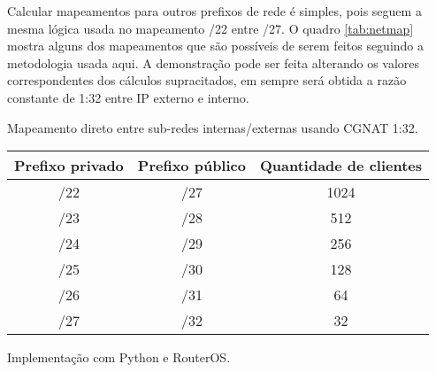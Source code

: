     Calcular mapeamentos para outros prefixos de rede é simples, pois seguem a mesma lógica usada no mapeamento /22 entre /27. O quadro \ref{tab:netmap} mostra alguns dos mapeamentos que são possíveis de serem feitos seguindo a metodologia usada aqui. A demonstração pode ser feita alterando os valores correspondentes dos cálculos supracitados, em sempre será obtida a razão constante de 1:32 entre IP externo e interno.

    \begin{quadro}[htb]
        \begin{center}
            \caption{Mapeamento direto entre sub-redes internas/externas usando CGNAT 1:32.} 
            \label{tab:netmap}
            \vspace{0.2cm}
            \footnotesize
            \begin{tabular}{|c|c|c|}
            \hline
            Prefixo privado & Prefixo público & Quantidade de clientes \\
            \hline
            \hline
            /22 & /27 & 1024 \\
            /23 & /28 & 512 \\
            /24 & /29 & 256 \\
            /25 & /30 & 128 \\
            /26 & /31 & 64 \\
            /27 & /32 & 32 \\
            \hline 
            \end{tabular}
        \end{center}
    \end{quadro}

Implementação com Python e RouterOS.

